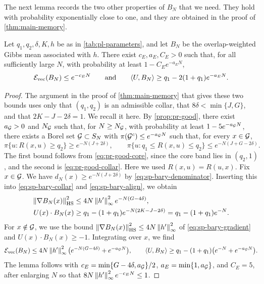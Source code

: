 The next lemma records the two other properties of $B_N$ that we need. They hold with probability exponentially close to one, and they are obtained in the proof of \cref{thm:main-memory}.

\begin{lemma}\label{lem:pl-energy}
Let $q_1,q_2,\delta,K,h$ be as in \cref{tab:pl-parameters}, and let $B_N$ be the overlap-weighted Gibbs mean associated with $h$. There exist $c_E,a_E,C_E>0$ such that, for all sufficiently large $N$, with probability at least $1-C_Ee^{-a_EN}$,
\[
\mathcal E_{\rm vec}(B_N)\le e^{-c_EN}\qquad\text{and}\qquad\langle U,B_N\rangle\ge q_1-2(1+q_1)e^{-a_EN}.
\]
\end{lemma}

\begin{proof}
The argument in the proof of \cref{thm:main-memory} that gives these two bounds uses only that $(q_1,q_2)$ is an admissible collar, that $8\delta<\min\{J,G\}$, and that $2K-J-2\delta=1$. We recall it here. By \cref{prop:pr-good}, there exist $a_\mathcal G>0$ and $N_\mathcal G$ such that, for $N\ge N_\mathcal G$, with probability at least $1-5e^{-a_\mathcal G N}$, there exists a Borel set $\mathcal G\subset S_N$ with $\pi(\mathcal G^c)\le e^{-a_\mathcal G N}$ such that, for every $x\in\mathcal G$,
\[
\pi\{u\colon R(x,u)\ge q_2\}\ge e^{-N(J+2\delta)},\qquad
\pi\{u\colon q_1\le R(x,u)\le q_2\}\le e^{-N(J+G-2\delta)}.
\]
The first bound follows from \eqref{eq:pr-good-core}, since the core band lies in $(q_2,1)$, and the second is \eqref{eq:pr-good-collar}. Here we used $R(x,u)=R(u,x)$. Fix $x\in\mathcal G$. We have $d_N(x)\ge e^{-N(J+2\delta)}$ by \eqref{eq:sp-bary-denominator}. Inserting this into \eqref{eq:sp-bary-collar} and \eqref{eq:sp-bary-align}, we obtain
\begin{align*}
\left\lVert\nabla B_N(x)\right\rVert_{\rm HS}^2&\le4N\left\lVert h'\right\rVert_\infty^2e^{-N(G-4\delta)},\\
U(x)\cdot B_N(x)&\ge q_1-(1+q_1)e^{-N(2K-J-2\delta)}=q_1-(1+q_1)e^{-N}.
\end{align*}
For $x\notin\mathcal G$, we use the bound $\left\lVert\nabla B_N(x)\right\rVert_{\rm HS}^2\le4N\left\lVert h'\right\rVert_\infty^2$ of \eqref{eq:sp-bary-gradient} and $U(x)\cdot B_N(x)\ge-1$. Integrating over $x$, we find
\[
\mathcal E_{\rm vec}(B_N)\le4N\left\lVert h'\right\rVert_\infty^2\bigl(e^{-N(G-4\delta)}+e^{-a_\mathcal G N}\bigr),\qquad
\langle U,B_N\rangle\ge q_1-(1+q_1)\bigl(e^{-N}+e^{-a_\mathcal G N}\bigr).
\]
The lemma follows with $c_E=\min\{G-4\delta,a_\mathcal G\}/2$, $a_E=\min\{1,a_\mathcal G\}$, and $C_E=5$, after enlarging $N$ so that $8N\left\lVert h'\right\rVert_\infty^2e^{-c_EN}\le1$.
\end{proof}

